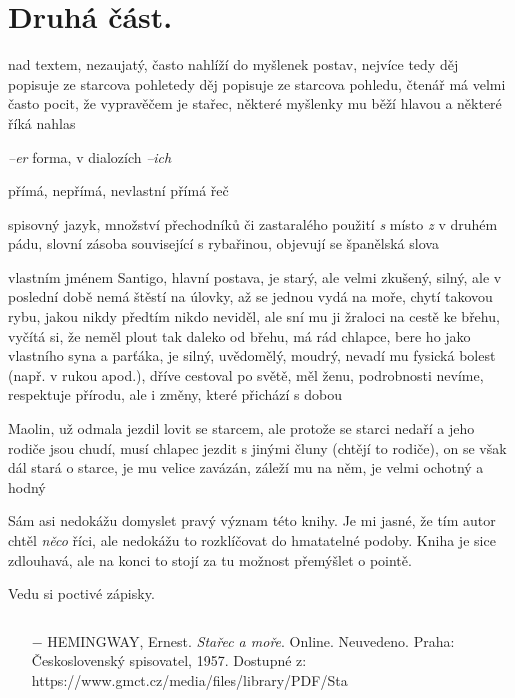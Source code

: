 \documentclass{article}
\begin{document}
\section{Druhá část.}
\begin{description}
    \setlength\itemsep{0.15em}
    \item[vypravěč:] nad textem, nezaujatý, často nahlíží do myšlenek postav, nejvíce tedy děj popisuje ze starcova pohletedy děj popisuje ze starcova pohledu, čtenář má velmi často pocit, že vypravěčem je stařec, některé myšlenky mu běží hlavou a některé říká nahlas
    \item[vyprávěcí způsoby:] \textit{--er} forma, v dialozích \textit{--ich}
    \item[typy promluv:] přímá, nepřímá, nevlastní přímá řeč
    \item[jazyková stránka:] spisovný jazyk, množství přechodníků či zastaralého použití \textit{s} místo \textit{z} v druhém pádu, slovní zásoba související s rybařinou, objevují se španělská slova
    \item[postavy:]
        \begin{description}
            \setlength\itemsep{0.15em}
            \item[stařec,] vlastním jménem Santigo, hlavní postava, je starý, ale velmi zkušený, silný, ale v poslední době nemá štěstí na úlovky, až se jednou vydá na moře, chytí takovou rybu, jakou nikdy předtím nikdo neviděl, ale sní mu ji žraloci na cestě ke břehu, vyčítá si, že neměl plout tak daleko od břehu, má rád chlapce, bere ho jako vlastního syna a parťáka, je silný, uvědomělý, moudrý, nevadí mu fysická bolest (např. v rukou apod.), dříve cestoval po světě, měl ženu, podrobnosti nevíme, respektuje přírodu, ale i změny, které přichází s dobou
            \item[chlapec,] Maolin, už odmala jezdil lovit se starcem, ale protože se starci nedaří a jeho rodiče jsou chudí, musí chlapec jezdit s jinými čluny (chtějí to rodiče), on se však dál stará o starce, je mu velice zavázán, záleží mu na něm, je velmi ochotný a hodný
        \end{description}
    \item[názor:] Sám asi nedokážu domyslet pravý význam této knihy. Je mi jasné, že tím autor chtěl \textit{něco} říci, ale nedokážu to rozklíčovat do hmatatelné podoby. Kniha je sice zdlouhavá, ale na konci to stojí za tu možnost přemýšlet o pointě.
    \item[kontext:]  Vedu si poctivé zápisky.
    \item[zdroje:] $ $
    \begin{itemize}
        \setlength\itemsep{0em}
        \item[$-$] HEMINGWAY, Ernest. \textit{Stařec a moře}. Online. Neuvedeno. Praha: Československý spisovatel, 1957. Dostupné z: https://www.gmct.cz/media/files/library/PDF/Sta%
    \end{itemize}
\end{description}
\end{document}
